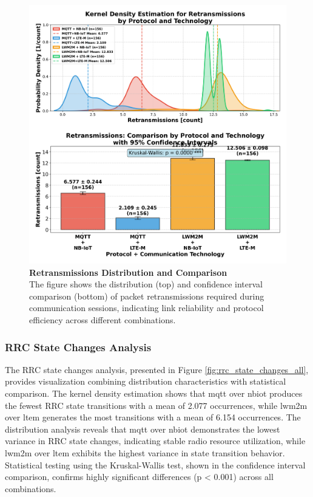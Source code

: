 \documentclass[12pt, english, openany]{book}
\begin{document}
\begin{figure}[htbp]
    \centering
    \includegraphics[width=1.0\textwidth]{retransmissions_all_protocol_tech_kde_ci.png}
    \caption{\textbf{Retransmissions Distribution and Comparison} \\ The figure shows the distribution (top) and confidence interval comparison (bottom) of packet retransmissions required during communication sessions, indicating link reliability and protocol efficiency across different combinations.}
    \label{fig:retransmissions_all}
\end{figure}
\FloatBarrier
\subsubsection*{RRC State Changes Analysis} \label{sec:rrc_state_changes_analysis}

The RRC state changes analysis, presented in Figure \ref{fig:rrc_state_changes_all}, provides visualization combining distribution characteristics with statistical comparison. The kernel density estimation shows that \gls{mqtt} over \gls{nbiot} produces the fewest RRC state transitions with a mean of 2.077 occurrences, while \gls{lwm2m} over \gls{ltem} generates the most transitions with a mean of 6.154 occurrences. The distribution analysis reveals that \gls{mqtt} over \gls{nbiot} demonstrates the lowest variance in RRC state changes, indicating stable radio resource utilization, while \gls{lwm2m} over \gls{ltem} exhibits the highest variance in state transition behavior. Statistical testing using the Kruskal-Wallis test, shown in the confidence interval comparison, confirms highly significant differences (p < 0.001) across all combinations.
\end{document}
